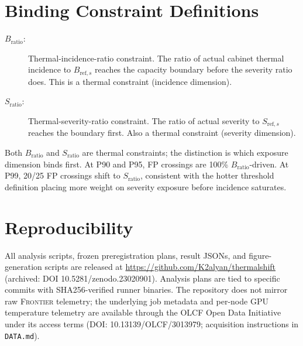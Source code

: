 \documentclass[acmsmall,screen,review,anonymous]{acmart}
\newcommand{\Frontier}{\textsc{Frontier}\xspace}
\begin{document}
\section{Binding Constraint Definitions}
\label{app:constraints}

\begin{description}
  \item[$B_\mathrm{ratio}$:] Thermal-incidence-ratio constraint.  The ratio of actual
    cabinet thermal incidence to $B_{\mathrm{ref},s}$ reaches the capacity boundary
    before the severity ratio does.  This is a thermal constraint (incidence dimension).

  \item[$S_\mathrm{ratio}$:] Thermal-severity-ratio constraint.  The ratio of actual
    severity to $S_{\mathrm{ref},s}$ reaches the boundary first.  Also a thermal
    constraint (severity dimension).
\end{description}

Both $B_\mathrm{ratio}$ and $S_\mathrm{ratio}$ are thermal constraints; the
distinction is which exposure dimension binds first.  At P90 and P95, FP crossings
are 100\% $B_\mathrm{ratio}$-driven.  At P99, 20/25 FP crossings shift to
$S_\mathrm{ratio}$, consistent with the hotter threshold definition placing more
weight on severity exposure before incidence saturates.

\section{Reproducibility}

All analysis scripts, frozen preregistration plans, result JSONs, and figure-generation
scripts are released at \url{https://github.com/K2alyan/thermalshift}
(archived: DOI 10.5281/zenodo.23020901).  Analysis plans are tied to specific commits
with SHA256-verified runner binaries.  The repository does not mirror raw \Frontier
telemetry; the underlying job metadata and per-node GPU temperature telemetry are
available through the OLCF Open Data Initiative under its access terms
(DOI: 10.13139/OLCF/3013979; acquisition instructions in \texttt{DATA.md}).
\end{document}
